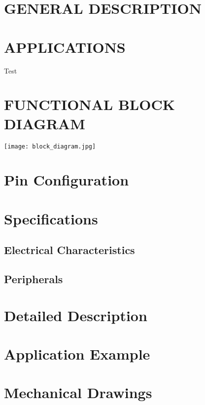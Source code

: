 \documentclass{../templates/datasheet}
\begin{document}
\section{GENERAL DESCRIPTION}


\section{APPLICATIONS}

Test
\section{FUNCTIONAL BLOCK DIAGRAM}
\texttt{[image: block\_diagram.jpg]}


\pagebreak
\tableofcontents
\pagebreak



\section{Pin Configuration}

\section{Specifications}
\subsection{Electrical Characteristics}
\subsection{Peripherals}




\section{Detailed Description}

\section{Application Example}

\section{Mechanical Drawings}
\end{document}
